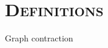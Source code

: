 \documentclass[xcolor=x11names,compress]{beamer}
\begin{document}
\section{\scshape Definitions}
{
\begin{frame}[t]{Graph contraction}
    \vspace*{-0.65cm}
    \begin{minipage}[t]{\textwidth}
        
        \hfill
        
    \end{minipage}
\end{frame}}
\end{document}
